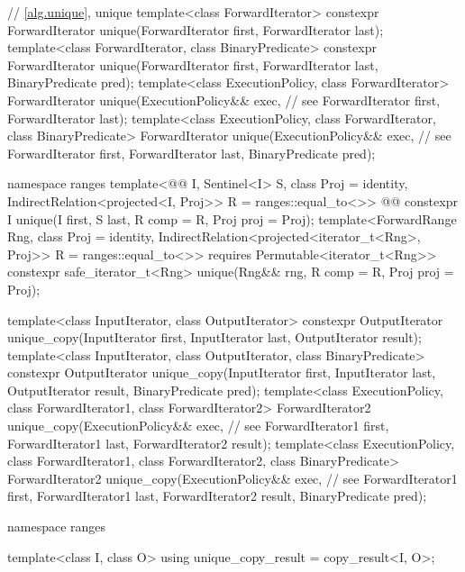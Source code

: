 \begin{codeblock}
  // \ref{alg.unique}, unique
  template<class ForwardIterator>
    constexpr ForwardIterator unique(ForwardIterator first, ForwardIterator last);
  template<class ForwardIterator, class BinaryPredicate>
    constexpr ForwardIterator unique(ForwardIterator first, ForwardIterator last,
                                     BinaryPredicate pred);
  template<class ExecutionPolicy, class ForwardIterator>
    ForwardIterator unique(ExecutionPolicy&& exec, // see 
                           ForwardIterator first, ForwardIterator last);
  template<class ExecutionPolicy, class ForwardIterator, class BinaryPredicate>
    ForwardIterator unique(ExecutionPolicy&& exec, // see 
                           ForwardIterator first, ForwardIterator last,
                           BinaryPredicate pred);
\end{codeblock}\begin{addedblock}\begin{codeblock}
  namespace ranges {
    template<@@ I, Sentinel<I> S, class Proj = identity,
        IndirectRelation<projected<I, Proj>> R = ranges::equal_to<>>
      @@
      constexpr I unique(I first, S last, R comp = R{}, Proj proj = Proj{});
    template<ForwardRange Rng, class Proj = identity,
        IndirectRelation<projected<iterator_t<Rng>, Proj>> R = ranges::equal_to<>>
      requires Permutable<iterator_t<Rng>>
      constexpr safe_iterator_t<Rng>
        unique(Rng&& rng, R comp = R{}, Proj proj = Proj{});
  }
\end{codeblock}\end{addedblock}\begin{codeblock}
  template<class InputIterator, class OutputIterator>
    constexpr OutputIterator
      unique_copy(InputIterator first, InputIterator last,
                  OutputIterator result);
  template<class InputIterator, class OutputIterator, class BinaryPredicate>
    constexpr OutputIterator
      unique_copy(InputIterator first, InputIterator last,
                  OutputIterator result, BinaryPredicate pred);
  template<class ExecutionPolicy, class ForwardIterator1, class ForwardIterator2>
    ForwardIterator2
      unique_copy(ExecutionPolicy&& exec, // see 
                  ForwardIterator1 first, ForwardIterator1 last,
                  ForwardIterator2 result);
  template<class ExecutionPolicy, class ForwardIterator1, class ForwardIterator2,
           class BinaryPredicate>
    ForwardIterator2
      unique_copy(ExecutionPolicy&& exec, // see 
                  ForwardIterator1 first, ForwardIterator1 last,
                  ForwardIterator2 result, BinaryPredicate pred);
\end{codeblock}\begin{addedblock}\begin{codeblock}
  namespace ranges {
    template<class I, class O>
    using unique_copy_result = copy_result<I, O>;

}
\end{codeblock}
\end{addedblock}
